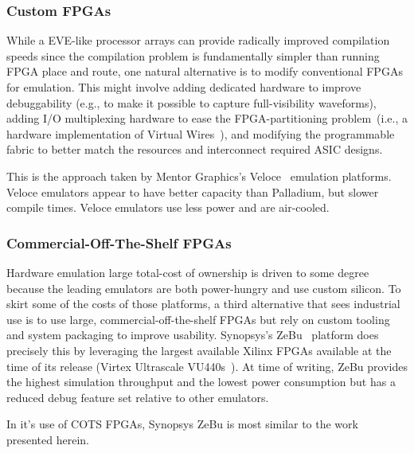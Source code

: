\subsubsection{Custom FPGAs}
While a EVE-like processor arrays can provide radically improved compilation speeds since
the compilation problem is fundamentally simpler than running FPGA place and
route, one natural alternative is to modify conventional FPGAs for emulation.
This might involve adding dedicated hardware to improve debuggability (e.g., to make it
possible to capture full-visibility waveforms), adding I/O multiplexing
hardware to ease the FPGA-partitioning problem~(i.e., a hardware implementation of Virtual Wires~\cite{VirtualWires}), and modifying the programmable
fabric to better match the resources and interconnect required ASIC designs.

This is the approach taken by Mentor Graphics's Veloce~\cite{Veloce} emulation platforms.
Veloce emulators appear to have better capacity than Palladium, but slower
compile times. Veloce emulators use less power and are air-cooled.

\subsubsection{Commercial-Off-The-Shelf FPGAs}

Hardware emulation large total-cost of ownership is driven to some degree
because the leading emulators are both power-hungry and use custom silicon. To
skirt some of the costs of those platforms, a third alternative that sees
industrial use is to use large, commercial-off-the-shelf FPGAs but rely on
custom tooling and system packaging to improve usability. Synopsys's
ZeBu~\cite{ZeBu} platform does precisely this by leveraging the largest
available Xilinx FPGAs available at the time of its release (Virtex Ultrascale
VU440s~\cite{ZeBu}). At time of writing, ZeBu provides the highest simulation
throughput and the lowest power consumption but has a reduced debug feature set
relative to other emulators.

In it's use of COTS FPGAs, Synopsys ZeBu is most similar to the work presented herein. 

